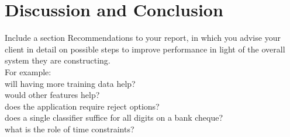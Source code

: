 \section{Discussion and Conclusion}
\label{sec:DiscConcl}

Include a section Recommendations to your report, in which you advise your client in detail on possible steps to improve performance in light of the overall system they are constructing. \\
For example:\\
will having more training data help?\\
would other features help? \\
does the application require reject options? \\
does a single classifier suffice for all digits on a bank cheque? \\
what is the role of time constraints?

